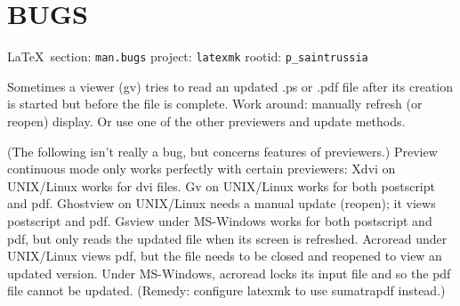  
 

\section{BUGS}

\vspace{0.5cm}
 {\ifDEBUG\small\LaTeX~section: \verb|man.bugs| project: \verb|latexmk| rootid: \verb|p_saintrussia| \fi}
\vspace{0.5cm}

Sometimes a viewer (gv) tries to read an updated .ps or .pdf file after its
creation is started but before the file is complete.  Work around: manually
refresh (or reopen) display.  Or use one of the other previewers and update
methods.

(The  following  isn't  really a bug, but concerns features of previewers.)
Preview continuous mode only works perfectly with  certain  previewers:  Xdvi
on  UNIX/Linux  works  for dvi files.  Gv on UNIX/Linux works for both
postscript and pdf.  Ghostview  on  UNIX/Linux  needs  a manual  update
(reopen); it views postscript and pdf.  Gsview under MS-Windows works for both
postscript and pdf, but only reads  the  updated file  when  its  screen  is
refreshed.  Acroread under UNIX/Linux views pdf, but the file needs to be
closed and reopened to  view  an  updated version.   Under  MS-Windows,
acroread locks its input file and so the pdf file cannot be updated.  (Remedy:
configure latexmk  to  use  sumatrapdf instead.)
